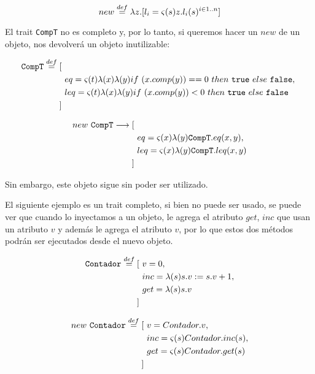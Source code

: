 $$new \overset{def}{=} \lambda z. [l_i = \varsigma(s)z.l_i(s)^{i\in 1..n}]$$

El trait \texttt{CompT} no es completo y, por lo tanto, si queremos hacer un $new$ de un objeto, nos devolverá un objeto inutilizable:

\begin{align*}
	\texttt{CompT}\overset{def}{=} [~& \\ &eq = \varsigma(t)\lambda(x)\lambda(y)if~ (x.comp(y)) == 0~ then~ \texttt{true}~ else~ \texttt{false},~\\
	&leq = \varsigma(t)\lambda(x)\lambda(y)if~ (x.comp(y)) < 0~ then~ \texttt{true}~ else~ \texttt{false} \\
	]~&
\end{align*}

\begin{align*}
new~\texttt{CompT}\longrightarrow [~& \\ &eq = \varsigma(x)\lambda(y)\texttt{CompT}.eq(x,y),~\\
&leq = \varsigma(x)\lambda(y)\texttt{CompT}.leq(x,y) \\
]~&
\end{align*}

Sin embargo, este objeto sigue sin poder ser utilizado.

El siguiente ejemplo es un trait completo, si bien no puede ser usado, se puede ver que cuando lo inyectamos a un objeto, le agrega el atributo $get$, $inc$ que usan un atributo $v$ y además le agrega el atributo $v$, por lo que estos dos métodos podrán ser ejecutados desde el nuevo objeto.

\vspace*{5mm}
\begin{align*}
\texttt{Contador}\overset{def}{=} [~& v = 0, \\
 & inc = \lambda(s) s.v := s.v + 1, \\
 & get = \lambda(s) s.v \\
 ]~&  \\
\end{align*}

\begin{align*}
new~\texttt{Contador}\overset{def}{=} [~& v = Contador.v, \\
 & inc = \varsigma(s) Contador.inc(s), \\
 & get = \varsigma(s) Contador.get(s) \\
 ]~&  \\
\end{align*}


